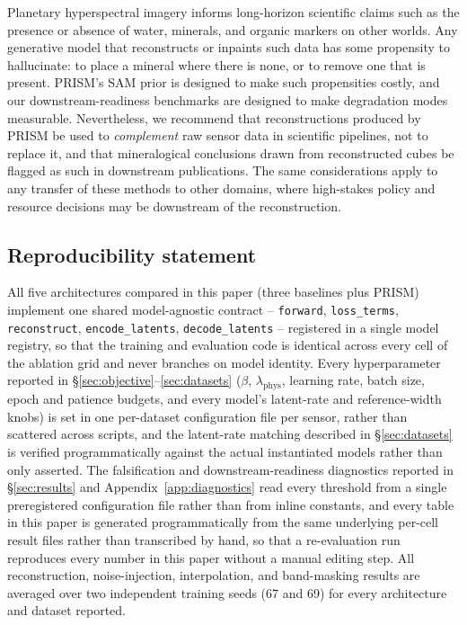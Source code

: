 \documentclass{article} %
\begin{document}
Planetary hyperspectral imagery informs long-horizon scientific claims such as the presence or absence of water, minerals, and organic markers on other worlds. Any generative model that reconstructs or inpaints such data has some propensity to hallucinate: to place a mineral where there is none, or to remove one that is present. PRISM's SAM prior is designed to make such propensities costly, and our downstream-readiness benchmarks are designed to make degradation modes measurable. Nevertheless, we recommend that reconstructions produced by PRISM be used to \emph{complement} raw sensor data in scientific pipelines, not to replace it, and that mineralogical conclusions drawn from reconstructed cubes be flagged as such in downstream publications. The same considerations apply to any transfer of these methods to other domains, where high-stakes policy and resource decisions may be downstream of the reconstruction.

\subsection*{Reproducibility statement}

All five architectures compared in this paper (three baselines plus PRISM) implement one shared model-agnostic contract -- \texttt{forward}, \texttt{loss\_terms}, \texttt{reconstruct}, \texttt{encode\_latents}, \texttt{decode\_latents} -- registered in a single model registry, so that the training and evaluation code is identical across every cell of the ablation grid and never branches on model identity. Every hyperparameter reported in \S\ref{sec:objective}--\ref{sec:datasets} ($\beta$, $\lambda_{\mathrm{phys}}$, learning rate, batch size, epoch and patience budgets, and every model's latent-rate and reference-width knobs) is set in one per-dataset configuration file per sensor, rather than scattered across scripts, and the latent-rate matching described in \S\ref{sec:datasets} is verified programmatically against the actual instantiated models rather than only asserted. The falsification and downstream-readiness diagnostics reported in \S\ref{sec:results} and Appendix~\ref{app:diagnostics} read every threshold from a single preregistered configuration file rather than from inline constants, and every table in this paper is generated programmatically from the same underlying per-cell result files rather than transcribed by hand, so that a re-evaluation run reproduces every number in this paper without a manual editing step. All reconstruction, noise-injection, interpolation, and band-masking results are averaged over two independent training seeds (67 and 69) for every architecture and dataset reported.
\end{document}

